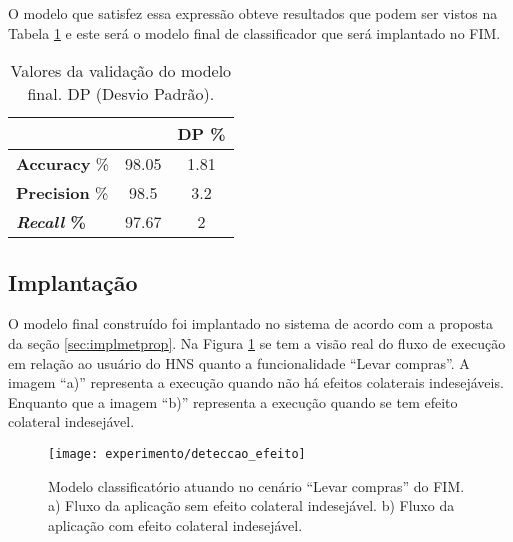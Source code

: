O modelo que satisfez essa expressão obteve resultados que podem ser vistos na Tabela \ref{table:valmodelfinal} e este será o modelo final de classificador que será implantado no FIM. 

\begin{table}[!htp]
  \centering
  \begin{tabular}{ |l|c|c|}
    \hline
       {\bf } & {\bf } & {\bf DP \%} \\
    \hline
       \textbf{Accuracy} \% & 98.05 & 1.81 \\
    \hline
       \textbf{Precision} \% & 98.5 & 3.2 \\
    \hline
       \textbf{\textit{Recall} \%} & 97.67 & 2 \\
    \hline
  \end{tabular}
  \caption{Valores da validação do modelo final. DP (Desvio Padrão).}
  \label{table:valmodelfinal}
\end{table}

\subsection{Implantação}
O modelo final construído foi implantado no sistema de acordo com a proposta da seção \ref{sec:implmetprop}. Na Figura \ref{fig:deteccao_efeito} se tem a visão real do fluxo de execução em relação ao usuário do HNS quanto a funcionalidade ``Levar compras''. A imagem ``a)'' representa a execução quando não há efeitos colaterais indesejáveis. Enquanto que a imagem ``b)'' representa a execução quando se tem efeito colateral indesejável. 

\begin{figure}[!htb] \centering 
  \centering
  \texttt{[image: experimento/deteccao\_efeito]} 
  \caption{Modelo classificatório atuando no cenário ``Levar compras'' do FIM. a) Fluxo da aplicação sem efeito colateral indesejável. b) Fluxo da aplicação com efeito colateral indesejável.} 
  \label{fig:deteccao_efeito}
\end{figure}
